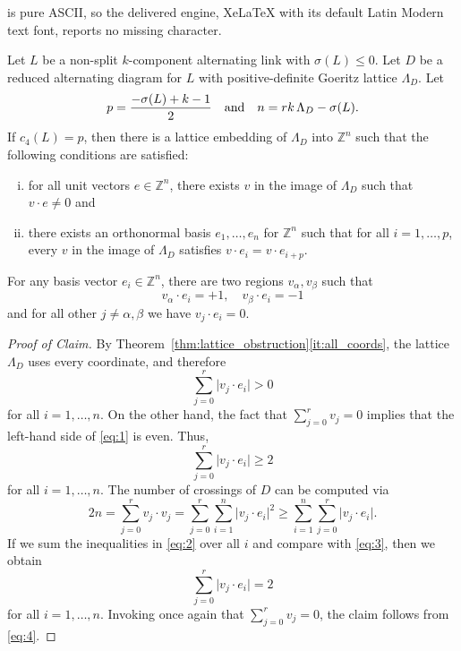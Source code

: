 \documentclass[10pt,a4paper]{amsart}
\newcommand{\Z}{\mathbb{Z}}
\newcommand{\rk}{{\rm rk}\,}
\begin{document}
is pure ASCII, so the delivered engine, XeLaTeX with its default Latin Modern text font, reports no missing character.
\begin{thm}\label{thm:lattice_obstruction}
Let $L$ be a non-split $k$-component alternating link with $\sigma(L)\leq 0$. Let $D$ be a reduced alternating diagram for $L$ with positive-definite Goeritz lattice $\Lambda_D$. Let 
\[p=\frac{-\sigma(L)+k-1}{2} \quad\text{and}\quad n=\rk \Lambda_D-\sigma(L).\] If $c_4(L)=p$, then there is a lattice embedding of $\Lambda_D$ into $\Z^n$ such that the following conditions are satisfied:
\begin{enumerate}[(i)]
    \item\label{it:all_coords} for all unit vectors $e\in \Z^n$, there exists $v$ in the image of $\Lambda_D$ such that $v\cdot e\neq 0$ and
    \item\label{it:u_disjoint_supports} there exists an orthonormal basis $e_1,\dots, e_n$ for $\Z^n$ such that for all $i=1, \dots, p$, every $v$ in the image of $\Lambda_D$ satisfies $v\cdot e_{i}=v\cdot e_{i+p}$.
\end{enumerate}
\end{thm}

\begin{claim}\label{claim1}
    For any basis vector $e_i\in \Z^n$, there are two regions $v_\alpha, v_\beta$ such that 
    \[v_\alpha \cdot e_i = +1,\quad v_\beta \cdot e_i=-1\] and for all other $j\neq \alpha,\beta$ we have $v_j\cdot e_i=0$.
\end{claim}

\begin{proof}[Proof of Claim]
By Theorem~\ref{thm:lattice_obstruction}\eqref{it:all_coords}, the lattice $\Lambda_D$ uses every coordinate, and therefore
\begin{equation}\label{eq:1}
\sum_{j=0}^r \bigl|v_j\cdot e_i\bigr|>0
\end{equation}
for all $i=1,\dots,n$. On the other hand, the fact that $\sum_{j=0}^r v_j=0$ implies that the left-hand side of \eqref{eq:1} is even. Thus,
\begin{equation}\label{eq:2}
\sum_{j=0}^r \bigl|v_j\cdot e_i\bigr|\ge 2
\end{equation}
for all $i=1,\dots,n$. The number of crossings of $D$ can be computed via
\begin{equation}\label{eq:3}
2n=\sum_{j=0}^r v_j\cdot v_j
=\sum_{j=0}^r\sum_{i=1}^n \bigl|v_j\cdot e_i\bigr|^2
\ge \sum_{i=1}^n\sum_{j=0}^r \bigl|v_j\cdot e_i\bigr|.
\end{equation}
If we sum the inequalities in \eqref{eq:2} over all $i$ and compare with \eqref{eq:3}, then we obtain
\begin{equation}\label{eq:4}
\sum_{j=0}^r \bigl|v_j\cdot e_i\bigr|=2
\end{equation}
for all $i=1,\dots,n$. Invoking once again that $\sum_{j=0}^r v_j=0$, the claim follows from \eqref{eq:4}.
\end{proof}
\end{document}
